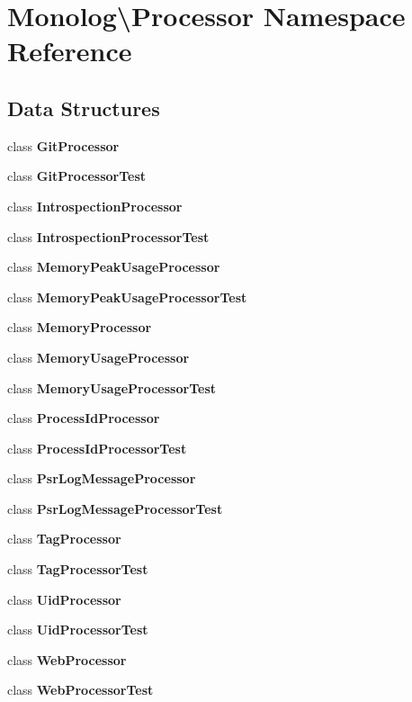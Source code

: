 \section{Monolog\textbackslash{}Processor Namespace Reference}
\label{namespace_monolog_1_1_processor}
\subsection*{Data Structures}
\begin{DoxyCompactItemize}
\item 
class {\bf Git\+Processor}
\item 
class {\bf Git\+Processor\+Test}
\item 
class {\bf Introspection\+Processor}
\item 
class {\bf Introspection\+Processor\+Test}
\item 
class {\bf Memory\+Peak\+Usage\+Processor}
\item 
class {\bf Memory\+Peak\+Usage\+Processor\+Test}
\item 
class {\bf Memory\+Processor}
\item 
class {\bf Memory\+Usage\+Processor}
\item 
class {\bf Memory\+Usage\+Processor\+Test}
\item 
class {\bf Process\+Id\+Processor}
\item 
class {\bf Process\+Id\+Processor\+Test}
\item 
class {\bf Psr\+Log\+Message\+Processor}
\item 
class {\bf Psr\+Log\+Message\+Processor\+Test}
\item 
class {\bf Tag\+Processor}
\item 
class {\bf Tag\+Processor\+Test}
\item 
class {\bf Uid\+Processor}
\item 
class {\bf Uid\+Processor\+Test}
\item 
class {\bf Web\+Processor}
\item 
class {\bf Web\+Processor\+Test}
\end{DoxyCompactItemize}
